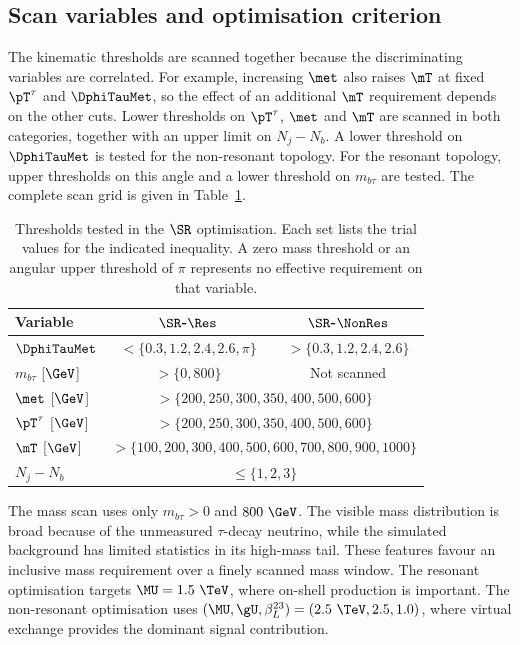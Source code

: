 \subsection{Scan variables and optimisation criterion}
\label{subsec:ch7_scan}

The kinematic thresholds are scanned together because the discriminating variables are correlated.
For example, increasing $\met$ also raises $\mT$ at fixed $\pT^\tau$ and $\DphiTauMet$, so the effect of an additional $\mT$ requirement depends on the other cuts.
Lower thresholds on $\pT^\tau$, $\met$ and $\mT$ are scanned in both categories, together with an upper limit on $N_j-N_b$.
A lower threshold on $\DphiTauMet$ is tested for the non-resonant topology.
For the resonant topology, upper thresholds on this angle and a lower threshold on $m_{b\tau}$ are tested.
The complete scan grid is given in Table~\ref{tab:ch7_scan_variables}.

\begin{table}[htbp]
    \centering
    \small
    \caption{Thresholds tested in the $\SR$ optimisation. Each set lists the trial values for the indicated inequality. A zero mass threshold or an angular upper threshold of $\pi$ represents no effective requirement on that variable.}
    \label{tab:ch7_scan_variables}
    \begin{tabular}{lcc}
        \toprule
        Variable & $\SR$-$\Res$ & $\SR$-$\NonRes$ \\
        \midrule
        $\DphiTauMet$ & $<\{0.3,1.2,2.4,2.6,\pi\}$ & $>\{0.3,1.2,2.4,2.6\}$ \\
        $m_{b\tau}$ [$\GeV$] & $>\{0,800\}$ & Not scanned \\
        $\met$ [$\GeV$] & \multicolumn{2}{c}{$>\{200,250,300,350,400,500,600\}$} \\
        $\pT^\tau$ [$\GeV$] & \multicolumn{2}{c}{$>\{200,250,300,350,400,500,600\}$} \\
        $\mT$ [$\GeV$] & \multicolumn{2}{c}{$>\{100,200,300,400,500,600,700,800,900,1000\}$} \\
        $N_j-N_b$ & \multicolumn{2}{c}{$\leq\{1,2,3\}$} \\
        \bottomrule
    \end{tabular}
\end{table}

The mass scan uses only $m_{b\tau}>0$ and $800~\GeV$.
The visible mass distribution is broad because of the unmeasured $\tau$-decay neutrino, while the simulated background has limited statistics in its high-mass tail.
These features favour an inclusive mass requirement over a finely scanned mass window.
The resonant optimisation targets $\MU=1.5~\TeV$, where on-shell production is important.
The non-resonant optimisation uses $(\MU,\gU,\beta_L^{23})=(2.5~\TeV,2.5,1.0)$, where virtual exchange provides the dominant signal contribution.


